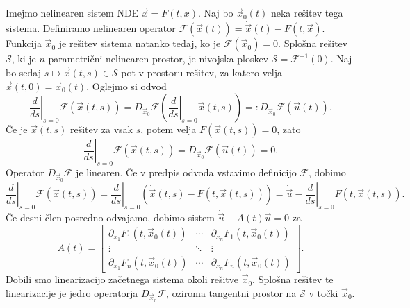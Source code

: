 
Imejmo nelinearen sistem NDE $\dot{\vec{x}} = F(t, x)$.
Naj bo $\vec{x}_0(t)$ neka rešitev tega sistema.
Definiramo nelinearen operator $\mathcal{F}(\vec{x}(t)) = \dot{\vec{x}}(t) - F(t,
\vec{x})$.
Funkcija $\vec{x}_0$ je rešitev sistema natanko tedaj, ko je
$\mathcal{F}(\vec{x}_0) = 0$.
Splošna rešitev $\mathcal{S}$, ki je $n$-parametrični nelinearen prostor, je
nivojska ploskev $\mathcal{S} = \mathcal{F}^{-1}(0)$.
Naj bo sedaj $s \mapsto \vec{x}(t, s) \in \mathcal{S}$ pot v prostoru rešitev,
za katero velja $\vec{x}(t, 0) = \vec{x}_0(t)$.
Oglejmo si odvod
\[
  \left.\frac{d}{ds}\right|_{s = 0} \mathcal{F}(\vec{x}(t, s))
  = D_{\vec{x}_0} \mathcal{F} \left( \left. \frac{d}{ds} \right|_{s=0}
	\vec{x}(t,s) \right)
  =: D_{\vec{x}_0} \mathcal{F} (\vec{u}(t)).
\]
Če je $\vec{x}(t, s)$ rešitev za vsak $s$, potem velja $F(\vec{x}(t, s)) = 0$,
zato
\[
  \left. \frac{d}{ds} \right|_{s = 0} \mathcal{F}(\vec{x}(t, s))
  = D_{\vec{x}_0} \mathcal{F} (\vec{u}(t)) = 0.
\]
Operator $D_{\vec{x}_0} \mathcal{F}$ je linearen.
Če v predpis odvoda vstavimo definicijo $\mathcal{F}$, dobimo
\[
  \left. \frac{d}{ds} \right|_{s = 0} \mathcal{F}(\vec{x}(t, s))
  = \left. \frac{d}{ds} \right|_{s=0} \left( \dot{\vec{x}}(t, s) - F(t,
	\vec{x}(t, s)) \right)
  = \dot{\vec{u}} - \left. \frac{d}{ds} \right|_{s=0} F(t, \vec{x}(t, s)).
\]
Če desni člen posredno odvajamo, dobimo sistem $\dot{\vec{u}} - A(t) \vec{u} =
0$ za
\[
  A(t) =
  \begin{bmatrix}
	\partial_{x_1} F_1(t, \vec{x}_0(t)) & \cdots & \partial_{x_n} F_1(t,
												   \vec{x}_0(t)) \\
	\vdots & \ddots & \vdots \\
	\partial_{x_1} F_n(t, \vec{x}_0(t)) & \cdots & \partial_{x_n} F_n(t, \vec{x}_0(t))
  \end{bmatrix}.
\]
Dobili smo linearizacijo začetnega sistema okoli rešitve $\vec{x}_0$.
Splošna rešitev te linearizacije je jedro operatorja $D_{\vec{x}_0}
\mathcal{F}$, oziroma tangentni prostor na $\mathcal{S}$ v točki $\vec{x}_0$.


